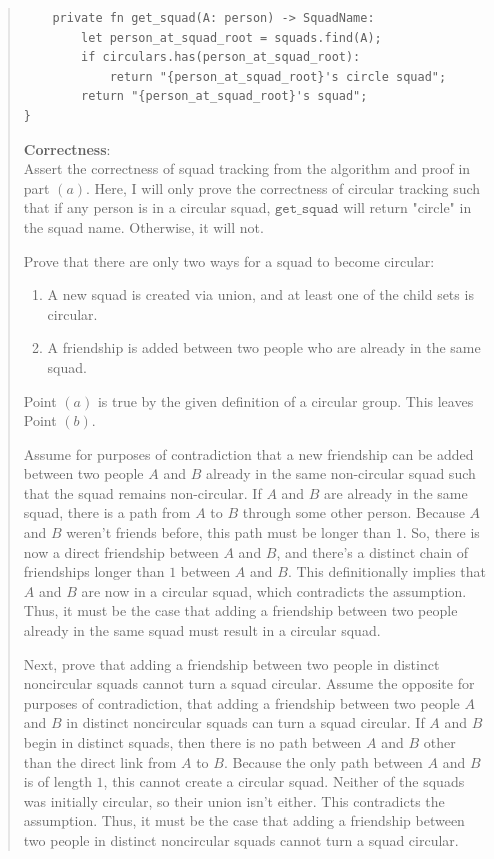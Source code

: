 \documentclass[11pt]{article}
\newcommand{\code}[1]{$\texttt{#1}$}
\begin{document}
\begin{enumerate}
\begin{quote}
\begin{verbatim}
    private fn get_squad(A: person) -> SquadName:
        let person_at_squad_root = squads.find(A);
        if circulars.has(person_at_squad_root):
            return "{person_at_squad_root}'s circle squad";
        return "{person_at_squad_root}'s squad";
}
\end{verbatim}

\medskip
\textbf{Correctness}: \\
Assert the correctness of squad tracking from the algorithm and proof in part $(a)$. Here, I will only prove the correctness of circular tracking such that if any person is in a circular squad, \code{get\_squad} will return "circle" in the squad name. Otherwise, it will not.

\medskip
Prove that there are only two ways for a squad to become circular:
\begin{enumerate}
  \item A new squad is created via union, and at least one of the child sets is circular. 
  \item A friendship is added between two people who are already in the same squad. 
\end{enumerate}

Point $(a)$ is true by the given definition of a circular group. This leaves Point $(b)$.

\medskip
Assume for purposes of contradiction that a new friendship can be added between two people $A$ and $B$ already in the same non-circular squad such that the squad remains non-circular. If $A$ and $B$ are already in the same squad, there is a path from $A$ to $B$ through some other person. Because $A$ and $B$ weren't friends before, this path must be longer than $1$. So, there is now a direct friendship between $A$ and $B$, and there's a distinct chain of friendships longer than $1$ between $A$ and $B$. This definitionally implies that $A$ and $B$ are now in a circular squad, which contradicts the assumption. Thus, it must be the case that adding a friendship between two people already in the same squad must result in a circular squad.

\medskip
Next, prove that adding a friendship between two people in distinct noncircular squads cannot turn a squad circular. Assume the opposite for purposes of contradiction, that adding a friendship between two people $A$ and $B$ in distinct noncircular squads can turn a squad circular. If $A$ and $B$ begin in distinct squads, then there is no path between $A$ and $B$ other than the direct link from $A$ to $B$. Because the only path between $A$ and $B$ is of length $1$, this cannot create a circular squad. Neither of the squads was initially circular, so their union isn't either. This contradicts the assumption. Thus, it must be the case that adding a friendship between two people in distinct noncircular squads cannot turn a squad circular.


\end{quote}
\end{enumerate}
\end{document}
